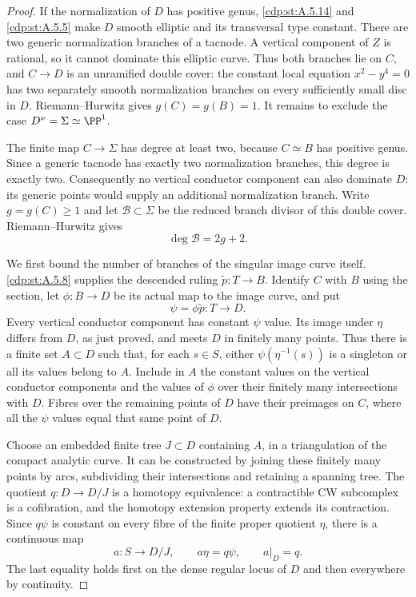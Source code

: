 \begin{proof}
If the normalization of $D$ has positive genus, \ref{cdp:st:A.5.14}
and \ref{cdp:st:A.5.5} make $D$ smooth elliptic and its transversal
type constant. There are two generic normalization
branches of a tacnode. A vertical component of $Z$
is rational, so it cannot dominate this elliptic curve.
Thus both branches lie on $C$, and $C\to D$ is an
unramified double cover: the constant local equation
$x^2-y^4=0$ has two separately smooth normalization
branches on every sufficiently small disc in $D$.
Riemann--Hurwitz gives $g(C)=g(B)=1$.
It remains to exclude the case $D^\nu=\Sigma\simeq\PP^1$.

The finite map $C\to\Sigma$ has degree at least two,
because $C\simeq B$ has positive genus. Since a generic
tacnode has exactly two normalization branches, this
degree is exactly two. Consequently no vertical
conductor component can also dominate $D$: its generic
points would supply an additional normalization branch.
Write $g=g(C)\ge1$ and let $\mathcal B\subset\Sigma$
be the reduced branch divisor of this double cover.
Riemann--Hurwitz gives
\[
                   \deg\mathcal B=2g+2.             \tag{A.T.1}\label{cdp:eq:A.T.1}
\]

We first bound the number of branches of the singular
image curve itself. \ref{cdp:st:A.5.8} supplies the descended ruling
$\widetilde p:T\to B$. Identify $C$ with $B$ using the
section, let $\phi:B\to D$ be its actual map to the
image curve, and put
\[
                    \psi=\phi\widetilde p:T\to D.
\]
Every vertical conductor component has constant $\psi$
value. Its image under $\eta$ differs from $D$, as just
proved, and meets $D$ in finitely many points. Thus
there is a finite set $A\subset D$ such that, for each
$s\in S$, either $\psi(\eta^{-1}(s))$ is a singleton
or all its values belong to $A$. Include in $A$ the
constant values on the vertical conductor components
and the values of $\phi$ over their finitely many
intersections with $D$. Fibres over the remaining
points of $D$ have their preimages on $C$, where all
the $\psi$ values equal that same point of $D$.

Choose an embedded finite tree $J\subset D$ containing
$A$, in a triangulation of the compact analytic curve.
It can be constructed by joining these finitely many
points by arcs, subdividing their intersections and
retaining a spanning tree. The quotient
$q:D\to D/J$ is a homotopy equivalence: a contractible
CW subcomplex is a cofibration, and the homotopy
extension property extends its contraction. Since
$q\psi$ is constant on every fibre of the finite
proper quotient $\eta$, there is a continuous map
\[
 a:S\to D/J,\qquad a\eta=q\psi,\qquad a|_D=q.     \tag{A.T.2}\label{cdp:eq:A.T.2}
\]
The last equality holds first on the dense regular
locus of $D$ and then everywhere by continuity.


\end{proof}
